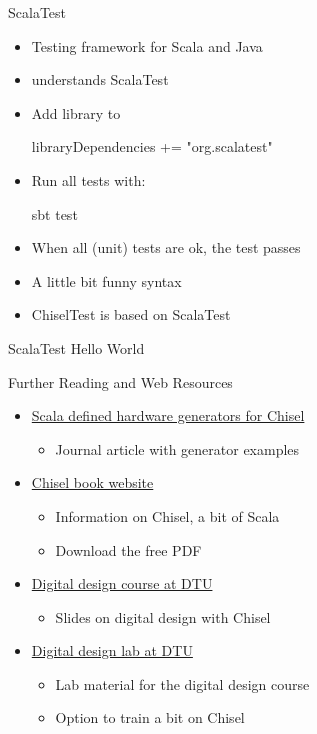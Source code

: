 \begin{frame}[fragile]{ScalaTest}
\begin{itemize}
\item Testing framework for Scala and Java
\item {} understands ScalaTest
\item Add library to 
\begin{chisel}
libraryDependencies += "org.scalatest" %
\end{chisel}
\item Run all tests with:
\begin{chisel}
sbt test
\end{chisel}
\item When all (unit) tests are ok, the test passes
\item A little bit funny syntax
\item ChiselTest is based on ScalaTest
\end{itemize}
\end{frame}

\begin{frame}[fragile]{ScalaTest Hello World}
\end{frame}


\begin{frame}[fragile]{Further Reading and Web Resources}
\begin{itemize}
\item \href{https://www.sciencedirect.com/science/article/pii/S014193312500050X}{Scala defined hardware generators for Chisel}
\begin{itemize}
\item Journal article with generator examples
\end{itemize}
\item \href{http://www.imm.dtu.dk/~masca/chisel-book.html}{Chisel book website}
\begin{itemize}
\item Information on Chisel, a bit of Scala
\item Download the free PDF
\end{itemize}
\item \href{http://www2.imm.dtu.dk/courses/02139/}{Digital design course at DTU}
\begin{itemize}
\item Slides on digital design with Chisel
\end{itemize}
\item \href{https://github.com/schoeberl/chisel-lab}{Digital design lab at DTU}
\begin{itemize}
\item Lab material for the digital design course
\item Option to train a bit on Chisel
\end{itemize}
\end{itemize}
\end{frame}

